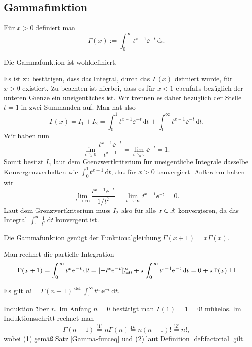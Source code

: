\subsection{Gammafunktion}

\begin{Definition}[Gammafunktion]
Für $x>0$ definiert man
\[\Gamma(x) := \int_0^\infty t^{x-1}\ee^{-t}\,\mathrm dt.\]
\end{Definition}

\begin{Satz}
Die Gammafunktion ist wohldefiniert.
\end{Satz}
\begin{Beweis}
Es ist zu bestätigen, dass das Integral, durch das $\Gamma(x)$ definiert
wurde, für $x>0$ existiert. Zu beachten ist hierbei, dass es
für $x<1$ ebenfalls bezüglich der unteren Grenze ein uneigentliches ist.
Wir trennen es daher bezüglich der Stelle $t=1$ in zwei Summanden auf.
Man hat also
\[\Gamma(x) = I_1 + I_2 = \int_0^1 t^{x-1}\ee^{-t}\,\mathrm dt +
\int_1^\infty t^{x-1}\ee^{-t}\,\mathrm dt.\]
Wir haben nun
\[\lim_{t\searrow 0} \frac{t^{x-1}\ee^{-t}}{t^{x-1}}
= \lim_{t\searrow 0}\ee^{-t} = 1.\]
Somit besitzt $I_1$ laut dem
Grenzwertkriterium für uneigentliche Integrale dasselbe
Konvergenzverhalten wie $\int_0^1 t^{x-1}\,\mathrm dt$, das für
$x>0$ konvergiert. Außerdem haben wir
\[\lim_{t\to\infty}\frac{t^{x-1}\ee^{-t}}{1/t^2}
= \lim_{t\to\infty} t^{x+1}\ee^{-t} = 0.\]
Laut dem Grenzwertkriterium muss $I_2$ also für alle $x\in\mathbb R$
konvergieren, da das Integral $\int_1^\infty \frac{1}{t^2}\,\mathrm dt$
konvergent ist.\,\qedsymbol
\end{Beweis}

\begin{Satz}\label{Gamma-funceq}
Die Gammafunktion genügt der Funktionalgleichung
$\Gamma(x+1)=x\Gamma(x)$.
\end{Satz}
\begin{Beweis}
Man rechnet die partielle Integration
\[\Gamma(x+1) = \int_0^\infty t^x\,\mathrm e^{-t}\,\mathrm dt =
[-t^x\mathrm e^{-t}]_{t=0}^\infty + x\int_0^\infty t^{x-1}\mathrm e^{-t}\,\mathrm dt
= 0 + x\Gamma(x).\,\square\]
\end{Beweis}

\begin{Satz}
Es gilt $n! = \Gamma(n+1) \stackrel{\text{def}}= \int_0^\infty t^n\,\ee^{-t}\,\mathrm dt$.
\end{Satz}
\begin{Beweis}
Induktion über $n$. Im Anfang $n=0$ bestätigt man $\Gamma(1)=1=0!$
mühelos. Im Induktionsschritt rechnet man
\[\Gamma(n+1) \stackrel{\text{(1)}}= n\Gamma(n)
\stackrel{\mathrm{IV}}= n(n-1)! \stackrel{\text{(2)}}= n!,\]
wobei (1) gemäß Satz \ref{Gamma-funceq} und (2) laut Definition
\ref{def:factorial} gilt.\,\qedsymbol
\end{Beweis}

